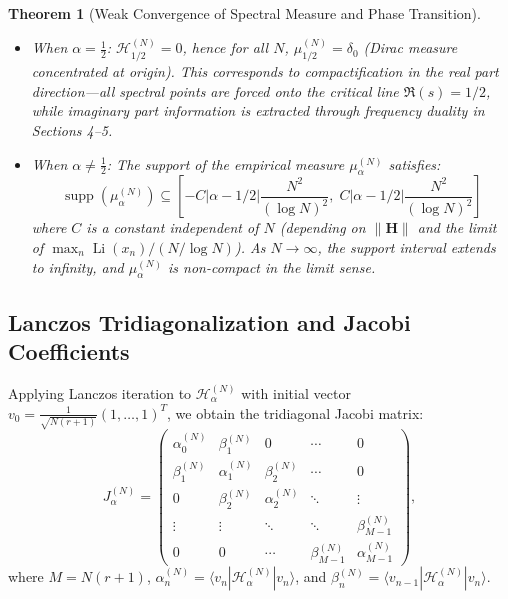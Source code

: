 \documentclass[12pt,a4paper]{amsart}
\theoremstyle{plain}
\newtheorem{theorem}{Theorem}[section]
\theoremstyle{definition}
\theoremstyle{remark}
\DeclareMathOperator{\supp}{supp}
\DeclareMathOperator{\Li}{Li}
\begin{document}
\begin{theorem}[Weak Convergence of Spectral Measure and Phase Transition]\label{thm:phasetrans}

\begin{itemize}
    \item When $\alpha = \frac{1}{2}$: $\mathcal{H}_{1/2}^{(N)} = 0$, hence for all $N$, $\mu_{1/2}^{(N)} = \delta_0$ (Dirac measure concentrated at origin). This corresponds to compactification in the real part direction---all spectral points are forced onto the critical line $\Re(s)=1/2$, while imaginary part information is extracted through frequency duality in Sections 4--5.
    
    \item When $\alpha \neq \frac{1}{2}$: The support of the empirical measure $\mu_\alpha^{(N)}$ satisfies:
    \begin{equation}
    \supp(\mu_\alpha^{(N)}) \subseteq \left[-C|\alpha-1/2|\frac{N^2}{(\log N)^2},\; C|\alpha-1/2|\frac{N^2}{(\log N)^2}\right]
    \end{equation}
    where $C$ is a constant independent of $N$ (depending on $\|\mathbf{H}\|$ and the limit of $\max_n \Li(x_n)/(N/\log N)$). As $N \to \infty$, the support interval extends to infinity, and $\mu_\alpha^{(N)}$ is non-compact in the limit sense.
\end{itemize}
\end{theorem}

\subsection{Lanczos Tridiagonalization and Jacobi Coefficients}

Applying Lanczos iteration to $\mathcal{H}_\alpha^{(N)}$ with initial vector $v_0 = \frac{1}{\sqrt{N(r+1)}}(1,\dots,1)^T$, we obtain the tridiagonal Jacobi matrix:
\begin{equation}
J_\alpha^{(N)} = \begin{pmatrix} 
\alpha_0^{(N)} & \beta_1^{(N)} & 0 & \cdots & 0 \\
\beta_1^{(N)} & \alpha_1^{(N)} & \beta_2^{(N)} & \cdots & 0 \\
0 & \beta_2^{(N)} & \alpha_2^{(N)} & \ddots & \vdots \\
\vdots & \vdots & \ddots & \ddots & \beta_{M-1}^{(N)} \\
0 & 0 & \cdots & \beta_{M-1}^{(N)} & \alpha_{M-1}^{(N)}
\end{pmatrix},
\end{equation}
where $M = N(r+1)$, $\alpha_n^{(N)} = \langle v_n | \mathcal{H}_\alpha^{(N)} | v_n \rangle$, and $\beta_n^{(N)} = \langle v_{n-1} | \mathcal{H}_\alpha^{(N)} | v_n \rangle$.
\end{document}
